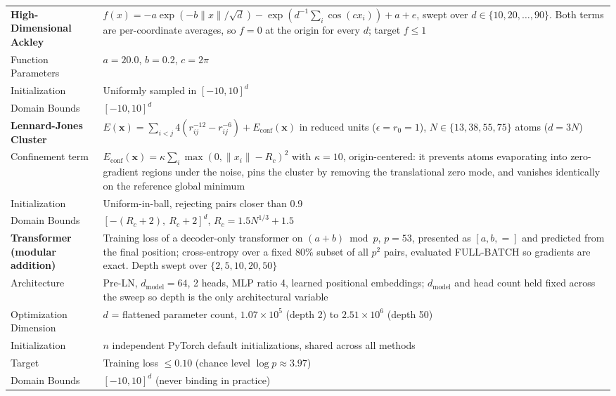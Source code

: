 \documentclass{article} %
\theoremstyle{plain}
\theoremstyle{definition}
\theoremstyle{remark}
\newcommand{\xx}{\mathbf{x}}
\begin{document}
\begin{table}[!htbp]
\begin{tabular}{@{}lp{}@{}}
\midrule
\textbf{High-Dimensional Ackley} & $f(x)=-a\exp(-b\lVert x\rVert/\sqrt{d})-\exp(d^{-1}\sum_i\cos(cx_i))+a+e$, swept over $d\in\{10,20,\dots,90\}$. Both terms are per-coordinate averages, so $f=0$ at the origin for every $d$; target $f\le1$ \\
Function Parameters & $a=20.0$, $b=0.2$, $c=2\pi$ \\
Initialization & Uniformly sampled in $[-10, 10]^d$ \\
Domain Bounds & $[-10, 10]^d$ \\
\midrule
\textbf{Lennard-Jones Cluster} & $E(\xx) = \sum_{i<j} 4(r_{ij}^{-12} - r_{ij}^{-6}) + E_{\text{conf}}(\xx)$ in reduced units ($\epsilon=r_0=1$), $N \in \{13, 38, 55, 75\}$ atoms ($d=3N$) \\
Confinement term & $E_{\text{conf}}(\xx) = \kappa\sum_i \max(0,\|x_i\|-R_c)^2$ with $\kappa=10$, origin-centered: it prevents atoms evaporating into zero-gradient regions under the noise, pins the cluster by removing the translational zero mode, and vanishes identically on the reference global minimum \\
Initialization & Uniform-in-ball, rejecting pairs closer than 0.9 \\
Domain Bounds & $[-(R_c+2),\ R_c+2]^d$, $R_c = 1.5 N^{1/3} + 1.5$ \\
\midrule
\textbf{Transformer (modular addition)} & Training loss of a decoder-only transformer on $(a+b)\bmod p$, $p=53$, presented as $[a,b,{=}]$ and predicted from the final position; cross-entropy over a fixed $80\%$ subset of all $p^2$ pairs, evaluated FULL-BATCH so gradients are exact. Depth swept over $\{2,5,10,20,50\}$ \\
Architecture & Pre-LN, $d_{\text{model}}=64$, 2 heads, MLP ratio 4, learned positional embeddings; $d_{\text{model}}$ and head count held fixed across the sweep so depth is the only architectural variable \\
Optimization Dimension & $d$ = flattened parameter count, $1.07\times10^5$ (depth 2) to $2.51\times10^6$ (depth 50) \\
Initialization & $n$ independent PyTorch default initializations, shared across all methods \\
Target & Training loss $\le0.10$ (chance level $\log p\approx3.97$) \\
Domain Bounds & $[-10,10]^d$ (never binding in practice) \\
\bottomrule
\end{tabular}
\end{table}
\end{document}
